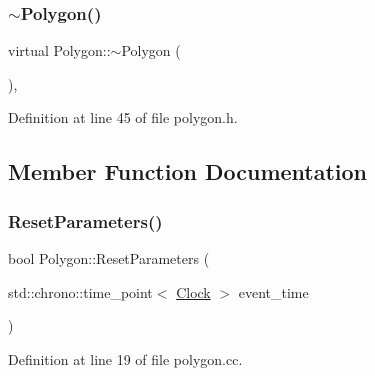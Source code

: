 \subsubsection{\texorpdfstring{$\sim$\+Polygon()}{~Polygon()}}
{\footnotesize\ttfamily virtual Polygon\+::$\sim$\+Polygon (\begin{DoxyParamCaption}{ }\end{DoxyParamCaption})\hspace{0.3cm}{\ttfamily [inline]}, {\ttfamily [virtual]}}



Definition at line 45 of file polygon.\+h.



\subsection{Member Function Documentation}
\mbox{\label{class_polygon_a0e2824d12cd6b18c8b14c64ef4b2bf97}} 
\subsubsection{\texorpdfstring{Reset\+Parameters()}{ResetParameters()}}
{\footnotesize\ttfamily bool Polygon\+::\+Reset\+Parameters (\begin{DoxyParamCaption}\item[{std\+::chrono\+::time\+\_\+point$<$ \mbox{\hyperlink{universe_8h_a0ef8d951d1ca5ab3cfaf7ab4c7a6fd80}{Clock}} $>$}]{event\+\_\+time }\end{DoxyParamCaption})}



Definition at line 19 of file polygon.\+cc.

